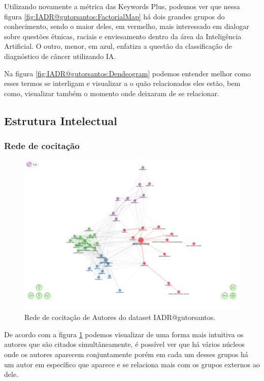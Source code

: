 Utilizando novamente a métrica das Keywords Plus, podemos ver que nessa figura \ref{fig:IADR@gutorsantos:FactorialMap} há dois grandes grupos do conhecimento, sendo o maior deles, em vermelho, mais interessado em dialogar sobre questões étnicas, raciais e enviesamento dentro da área da Inteligência Artificial. O outro, menor, em azul, enfatiza a questão da classificação de diagnóstico de câncer utilizando IA. 

Na figura \ref{fig:IADR@gutorsantos:Dendeogram} podemos entender melhor como esses termos se interligam e visualizar a o quão relacionados eles estão, bem como, visualizar também o momento onde deixaram de se relacionar.


\subsection{Estrutura Intelectual}

\subsubsection{Rede de cocitação}

\begin{figure}
    \centering
\includegraphics[angle=0,width=1\textwidth]{experiments/gutorsantos/AnaliseBibliometrica/IAeDiscriminacao/imgs/CoCitation.png}
    \caption{Rede de cocitação de Autores do dataset IADR@gutorsantos.}
    \label{fig:IADR@gutorsantos:Cocitation}
\end{figure}

De acordo com a figura \ref{fig:IADR@gutorsantos:Cocitation} podemos visualizar de uma forma mais intuitiva os autores que são citados simultâneamente, é possível ver que há vários núcleos onde os autores aparecem conjuntamente porém em cada um desses grupos há um autor em específico que aparece e se relaciona mais com os grupos externos ao dele.


